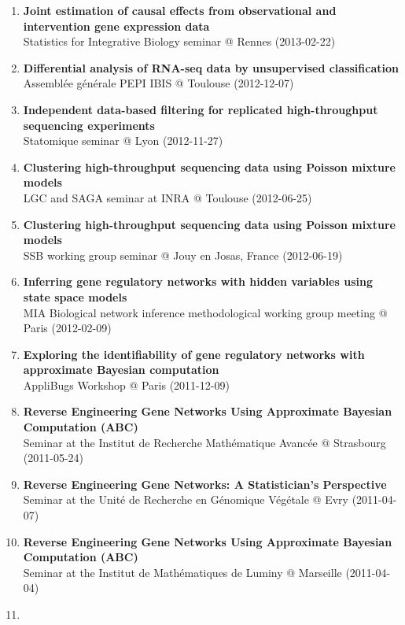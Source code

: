 \documentclass[11pt, a4paper]{awesome-cv}
\begin{document}
\begin{enumerate}
{  intervention gene expression data}\\
  Statistics seminar @ Toulouse (2013-06-18)
\item
  \textbf{Joint estimation of causal effects from observational and
  intervention gene expression data}\\
  Statistics for Integrative Biology seminar @ Rennes (2013-02-22)
\item
  \textbf{Differential analysis of RNA-seq data by unsupervised
  classification}\\
  Assemblée générale PEPI IBIS @ Toulouse (2012-12-07)
\item
  \textbf{Independent data-based filtering for replicated
  high-throughput sequencing experiments}\\
  Statomique seminar @ Lyon (2012-11-27)
\item
  \textbf{Clustering high-throughput sequencing data using Poisson
  mixture models}\\
  LGC and SAGA seminar at INRA @ Toulouse (2012-06-25)
\item
  \textbf{Clustering high-throughput sequencing data using Poisson
  mixture models}\\
  SSB working group seminar @ Jouy en Josas, France (2012-06-19)
\item
  \textbf{Inferring gene regulatory networks with hidden variables using
  state space models}\\
  MIA Biological network inference methodological working group meeting
  @ Paris (2012-02-09)
\item
  \textbf{Exploring the identifiability of gene regulatory networks with
  approximate Bayesian computation}\\
  AppliBugs Workshop @ Paris (2011-12-09)
\item
  \textbf{Reverse Engineering Gene Networks Using Approximate Bayesian
  Computation (ABC)}\\
  Seminar at the Institut de Recherche Mathématique Avancée @ Strasbourg
  (2011-05-24)
\item
  \textbf{Reverse Engineering Gene Networks: A Statistician's
  Perspective}\\
  Seminar at the Unité de Recherche en Génomique Végétale @ Evry
  (2011-04-07)
\item
  \textbf{Reverse Engineering Gene Networks Using Approximate Bayesian
  Computation (ABC)}\\
  Seminar at the Institut de Mathématiques de Luminy @ Marseille
  (2011-04-04)
\item

\end{enumerate}
\end{document}
